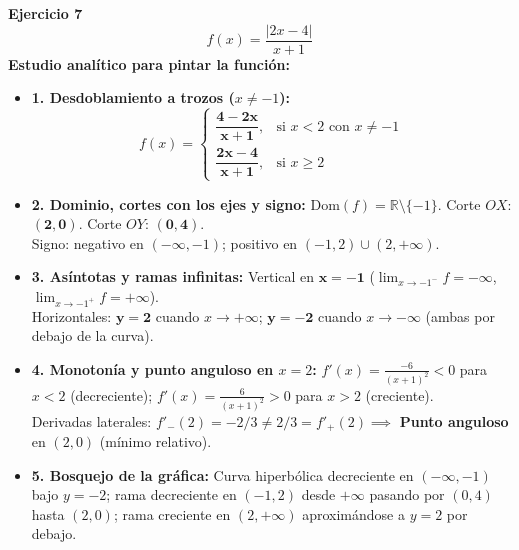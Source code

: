 \documentclass[11pt,a4paper]{article}
\begin{document}
\vspace{0.4cm}
\noindent\textbf{Ejercicio 7}
\[
f(x) = \frac{|2x - 4|}{x + 1}
\]
\textbf{Estudio analítico para pintar la función:}
\begin{itemize}[leftmargin=1.5em, itemsep=5pt]
    \item \textbf{1. Desdoblamiento a trozos ($x \ne -1$):}
    \[
    f(x) = \begin{cases} \mathbf{\dfrac{4 - 2x}{x + 1}}, & \text{si } x < 2 \text{ con } x \ne -1 \\[8pt] \mathbf{\dfrac{2x - 4}{x + 1}}, & \text{si } x \ge 2 \end{cases}
    \]
    \item \textbf{2. Dominio, cortes con los ejes y signo:}
    $\text{Dom}(f) = \mathbb{R} \setminus \{-1\}$. Corte $OX$: $\mathbf{(2, 0)}$. Corte $OY$: $\mathbf{(0, 4)}$.\\
    Signo: negativo en $(-\infty, -1)$; positivo en $(-1, 2) \cup (2, +\infty)$.
    \item \textbf{3. Asíntotas y ramas infinitas:}
    Vertical en $\mathbf{x = -1}$ ($\lim_{x \to -1^-} f = -\infty$, $\lim_{x \to -1^+} f = +\infty$).\\
    Horizontales: $\mathbf{y = 2}$ cuando $x \to +\infty$; $\mathbf{y = -2}$ cuando $x \to -\infty$ (ambas por debajo de la curva).
    \item \textbf{4. Monotonía y punto anguloso en $x = 2$:}
    $f'(x) = \frac{-6}{(x+1)^2} < 0$ para $x < 2$ (decreciente); $f'(x) = \frac{6}{(x+1)^2} > 0$ para $x > 2$ (creciente).\\
    Derivadas laterales: $f'_-(2) = -2/3 \ne 2/3 = f'_+(2) \implies$ \textbf{Punto anguloso} en $(2, 0)$ (mínimo relativo).
    \item \textbf{5. Bosquejo de la gráfica:} Curva hiperbólica decreciente en $(-\infty, -1)$ bajo $y = -2$; rama decreciente en $(-1, 2)$ desde $+\infty$ pasando por $(0, 4)$ hasta $(2, 0)$; rama creciente en $(2, +\infty)$ aproximándose a $y = 2$ por debajo.
\end{itemize}
\end{document}

